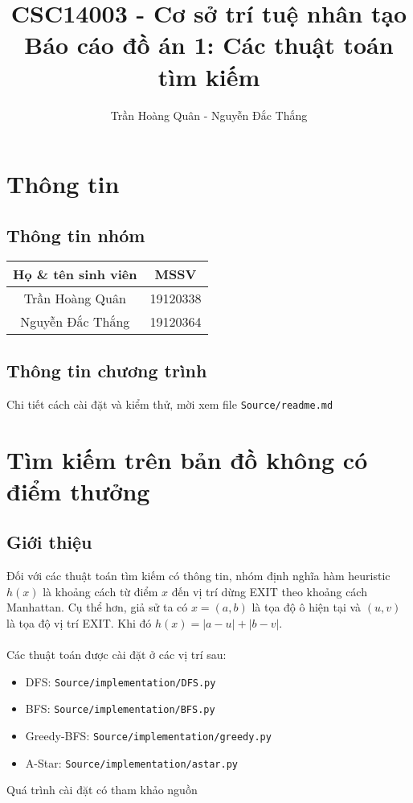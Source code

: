 \documentclass[12pt]{article}
\title{
	CSC14003 - Cơ sở trí tuệ nhân tạo\\
	Báo cáo đồ án 1: Các thuật toán tìm kiếm
}
\author{Trần Hoàng Quân - Nguyễn Đắc Thắng}
\begin{document}
\maketitle
\tableofcontents
\pagebreak

\section{Thông tin}
\subsection{Thông tin nhóm}
\begin{table}[ht]
\centering
\begin{tabular}{|c|c|}
\hline
Họ \& tên sinh viên & MSSV \\
\hline
Trần Hoàng Quân & 19120338 \\
Nguyễn Đắc Thắng & 19120364 \\
\hline
\end{tabular}
\end{table}

\subsection{Thông tin chương trình}
Chi tiết cách cài đặt và kiểm thử, mời xem file \texttt{Source/readme.md}
\section{Tìm kiếm trên bản đồ không có điểm thưởng}
\subsection{Giới thiệu}
Đối với các thuật toán tìm kiếm có thông tin, nhóm định nghĩa hàm heuristic $h(x)$ là khoảng cách từ điểm $x$ đến vị trí dừng EXIT theo khoảng cách Manhattan. Cụ thể hơn, giả sử ta có $x = (a, b)$ là tọa độ ô hiện tại và $(u, v)$ là tọa độ vị trí EXIT. Khi đó $h(x) = |a-u| + |b-v|$.
\\\\
Các thuật toán được cài đặt ở các vị trí sau:
\begin{itemize}
\item DFS: \texttt{Source/implementation/DFS.py}
\item BFS: \texttt{Source/implementation/BFS.py}
\item Greedy-BFS: \texttt{Source/implementation/greedy.py}
\item A-Star: \texttt{Source/implementation/astar.py}
\end{itemize}
Quá trình cài đặt có tham khảo nguồn \cite{redblob}
\end{document}
